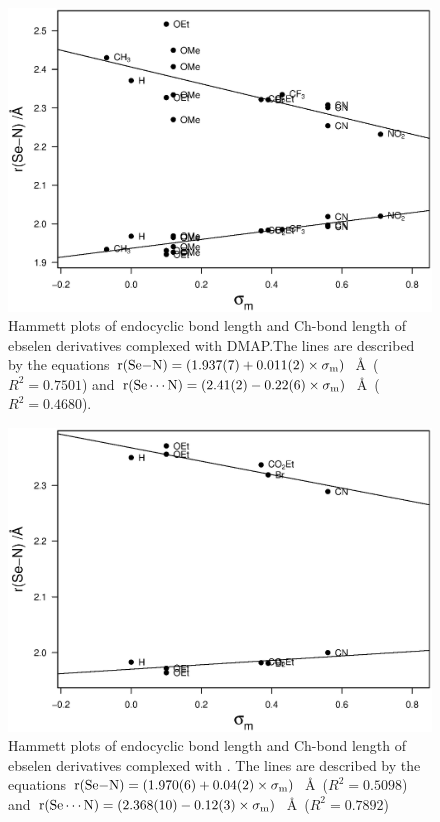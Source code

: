 \begin{refsection}
\begin{figure}
  \centering
  \includegraphics[width=0.7\linewidth]{Figures/hammett-dmap-meta.eps}
  \caption[Hammett plots of endocyclic  bond length and  Ch-bond length of ebselen derivatives complexed with DMAP.]{Hammett plots of endocyclic  bond length and  Ch-bond length of ebselen derivatives complexed with DMAP.\@ The lines are described by the equations $\mathrm{r}(\ce{Se-N}) = (1.937(7) + 0.011(2) \times \sigma_\text{m})$~\AA~($R^2=0.7501$) and $\mathrm{r}(\ce{Se\cdots N}) = (2.41(2) - 0.22(6) \times \sigma_\text{m})$~\AA~($R^2=0.4680$).}\label{fig:hammett-dmap-meta}
\end{figure}

\begin{figure}
\centering
\includegraphics[width=0.7\linewidth]{Figures/hammett-pyrrol-meta.eps}
\caption[Hammett plots of endocyclic  bond length and  Ch-bond length of ebselen derivatives complexed with .]{Hammett plots of endocyclic  bond length and  Ch-bond length of ebselen derivatives complexed with . The lines are described by the equations $\mathrm{r}(\ce{Se-N}) = (1.970(6) + 0.04(2) \times \sigma_\text{m})$~\AA~($R^2=0.5098$) and $\mathrm{r}(\ce{Se\cdots N}) = (2.368(10) - 0.12(3) \times \sigma_\text{m})$~\AA~($R^2=0.7892$)}\label{fig:hammett-pyrrol-meta}
\end{figure}


\end{refsection}
